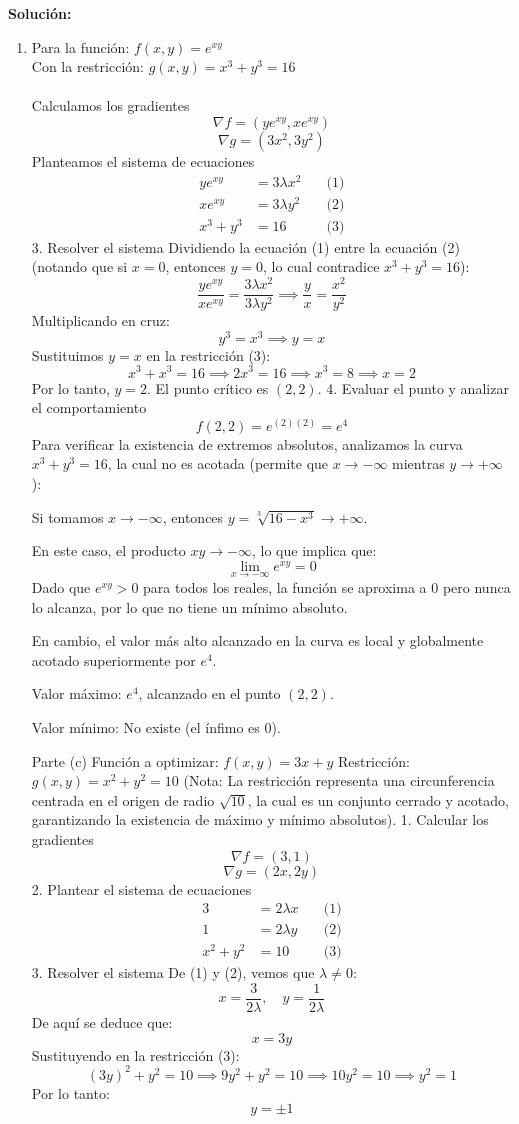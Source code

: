 \documentclass[12pt,a4paper]{report}
\newcommand{\solutionname}{Solución:}
\newenvironment{solution}{
 	\par\noindent\textbf{\color{structurecolor}\solutionname}
 	\color{black!90}}{\hfill\quad\par}
\begin{document}
\begin{solution}
\begin{enumerate}
\item [b)]
Para la función: $f(x, y) = e^{xy}$\\
Con la restricción: $g(x, y) = x^3 + y^3 = 16$\\
\\
Calculamos los gradientes
$$\nabla f = \left( y e^{xy}, x e^{xy} \right)$$
$$\nabla g = \left( 3x^2, 3y^2 \right)$$
Planteamos el sistema de ecuaciones
$$\begin{aligned}
y e^{xy} &= 3\lambda x^2 \quad &\text{(1)} \\
x e^{xy} &= 3\lambda y^2 \quad &\text{(2)} \\
x^3 + y^3 &= 16 \quad &\text{(3)}
\end{aligned}$$
3. Resolver el sistema
Dividiendo la ecuación (1) entre la ecuación (2) (notando que si $x=0$, entonces $y=0$, lo cual contradice $x^3+y^3=16$):
$$\frac{y e^{xy}}{x e^{xy}} = \frac{3\lambda x^2}{3\lambda y^2} \implies \frac{y}{x} = \frac{x^2}{y^2}$$
Multiplicando en cruz:
$$y^3 = x^3 \implies y = x$$
Sustituimos $y = x$ en la restricción (3):
$$x^3 + x^3 = 16 \implies 2x^3 = 16 \implies x^3 = 8 \implies x = 2$$
Por lo tanto, $y = 2$. El punto crítico es $(2, 2)$.
4. Evaluar el punto y analizar el comportamiento
$$f(2, 2) = e^{(2)(2)} = e^4$$
Para verificar la existencia de extremos absolutos, analizamos la curva $x^3 + y^3 = 16$, la cual no es acotada (permite que $x \to -\infty$ mientras $y \to +\infty$):


Si tomamos $x \to -\infty$, entonces $y = \sqrt[3]{16 - x^3} \to +\infty$.


En este caso, el producto $xy \to -\infty$, lo que implica que:
$$\lim_{x \to -\infty} e^{xy} = 0$$
Dado que $e^{xy} > 0$ para todos los reales, la función se aproxima a $0$ pero nunca lo alcanza, por lo que no tiene un mínimo absoluto.


En cambio, el valor más alto alcanzado en la curva es local y globalmente acotado superiormente por $e^4$.


Valor máximo: $e^4$, alcanzado en el punto $(2, 2)$.


Valor mínimo: No existe (el ínfimo es $0$).



Parte (c)
Función a optimizar: $f(x, y) = 3x + y$
Restricción: $g(x, y) = x^2 + y^2 = 10$
(Nota: La restricción representa una circunferencia centrada en el origen de radio $\sqrt{10}$, la cual es un conjunto cerrado y acotado, garantizando la existencia de máximo y mínimo absolutos).
1. Calcular los gradientes
$$\nabla f = (3, 1)$$
$$\nabla g = (2x, 2y)$$
2. Plantear el sistema de ecuaciones
$$\begin{aligned}
3 &= 2\lambda x \quad &\text{(1)} \\
1 &= 2\lambda y \quad &\text{(2)} \\
x^2 + y^2 &= 10 \quad &\text{(3)}
\end{aligned}$$
3. Resolver el sistema
De (1) y (2), vemos que $\lambda \neq 0$:
$$x = \frac{3}{2\lambda}, \quad y = \frac{1}{2\lambda}$$
De aquí se deduce que:
$$x = 3y$$
Sustituyendo en la restricción (3):
$$(3y)^2 + y^2 = 10 \implies 9y^2 + y^2 = 10 \implies 10y^2 = 10 \implies y^2 = 1$$
Por lo tanto:
$$y = \pm 1$$


\end{enumerate}
\end{solution}
\end{document}
